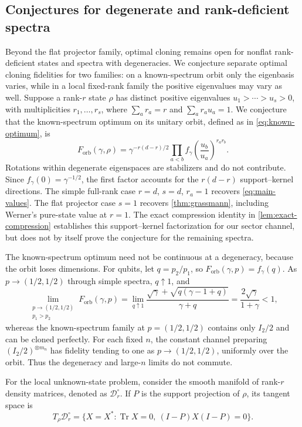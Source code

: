 \documentclass[11pt]{article}
\theoremstyle{remark}
\theoremstyle{plain}
\newcommand{\Tr}{\operatorname{Tr}}
\newcommand{\ot}{\otimes}
\newcommand{\Forb}{F_{\mathrm{orb}}}
\begin{document}
\subsection{Conjectures for degenerate and rank-deficient spectra}
\label{sec:conjectures}
Beyond the flat projector family, optimal cloning remains open for
nonflat rank-deficient states and spectra with degeneracies.  We conjecture separate optimal cloning fidelities for two families: on a known-spectrum orbit only the eigenbasis varies, while in
a local fixed-rank family the positive eigenvalues may vary as well.
Suppose a rank-\(r\) state \(\rho\) has distinct positive eigenvalues
\(u_1>\cdots>u_s>0\), with multiplicities \(r_1,\ldots,r_s\), where
\(\sum_a r_a=r\) and \(\sum_a r_a u_a=1\).  We conjecture that the
known-spectrum optimum on its unitary orbit, defined as in
\eqref{eq:known-optimum}, is
\begin{equation}\label{eq:conjectured-degenerate-orbit}
  \Forb(\gamma,\rho)
  =\gamma^{-r(d-r)/2}
   \prod_{a<b}f_\gamma\!\left(\frac{u_b}{u_a}\right)^{r_ar_b}.
\end{equation}
Rotations within degenerate eigenspaces are stabilizers and do not
contribute.  Since
\(f_\gamma(0)=\gamma^{-1/2}\), the first factor accounts for the
\(r(d-r)\) support--kernel directions.  The simple full-rank case
\(r=d\), \(s=d\), \(r_a=1\) recovers \eqref{eq:main-values}. The flat
projector case \(s=1\) recovers \cref{thm:grassmann}, including Werner's
pure-state value at \(r=1\).  The exact compression identity in
\cref{lem:exact-compression} establishes this support--kernel factorization
for our sector channel, but does not by itself prove the conjecture for the
remaining spectra.

The known-spectrum optimum need not be continuous at a degeneracy,
because the orbit loses dimensions.  For qubits, let \(q=p_2/p_1\), so
\(\Forb(\gamma,p)=f_\gamma(q)\).  As \(p\to(1/2,1/2)\) through simple
spectra, \(q\uparrow1\), and
\[
  \lim_{\substack{p\to(1/2,1/2)\\p_1>p_2}}
  \Forb(\gamma,p)
  =\lim_{q\uparrow1}
    \frac{\sqrt\gamma+\sqrt{q(\gamma-1+q)}}{\gamma+q}
  =\frac{2\sqrt\gamma}{1+\gamma}<1,
\]
whereas the known-spectrum family at \(p=(1/2,1/2)\) contains only
\(I_2/2\) and can be cloned perfectly.  For each fixed \(n\), the constant
channel preparing \((I_2/2)^{\ot m_n}\) has fidelity tending to one as
\(p\to(1/2,1/2)\), uniformly over the orbit.  Thus the degeneracy and
large-$n$ limits do not commute.

For the local unknown-state problem, consider the smooth manifold of
rank-\(r\) density matrices, denoted as $ \mathcal D_r^\circ$.
If \(P\) is the support projection of \(\rho\), its tangent space is
\begin{equation}\label{eq:fixed-rank-tangent-space}
  T_\rho\mathcal D_r^\circ
  =\{X=X^*:\Tr X=0,\ (I-P)X(I-P)=0\}.
\end{equation}
\end{document}
